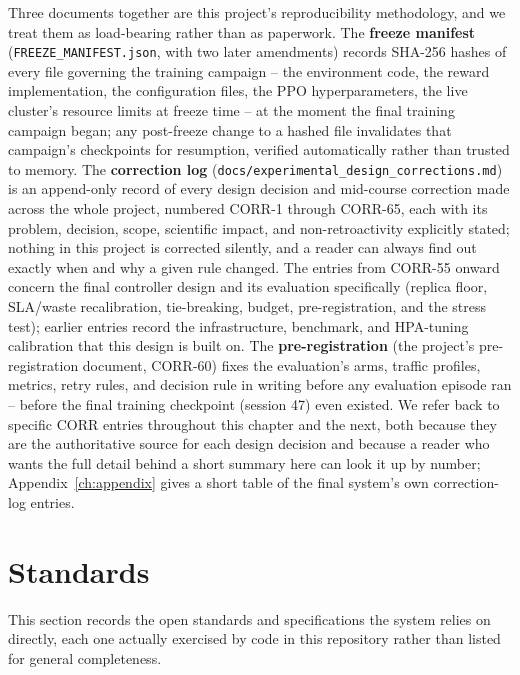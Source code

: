 Three documents together are this project's reproducibility methodology,
and we treat them as load-bearing rather than as paperwork. The
\textbf{freeze manifest} (\texttt{FREEZE\_\allowbreak MANIFEST.json}, with two later
amendments) records SHA-256 hashes of every file governing the training
campaign -- the environment code, the reward implementation, the
configuration files, the PPO hyperparameters, the live cluster's resource
limits at freeze time -- at the moment the final training campaign began;
any post-freeze change to a hashed file invalidates that campaign's
checkpoints for resumption, verified automatically rather than trusted to
memory. The \textbf{correction log}
(\texttt{docs/\allowbreak \allowbreak experimental\_\allowbreak design\_\allowbreak corrections.md}) is an
append-only record of every design decision and mid-course correction made
across the whole project, numbered CORR-1 through CORR-65, each with its
problem, decision, scope, scientific impact, and non-retroactivity
explicitly stated; nothing in this project is corrected silently, and a
reader can always find out exactly when and why a given rule changed. The
entries from CORR-55 onward concern the final controller design and its
evaluation specifically (replica floor, SLA/waste recalibration,
tie-breaking, budget, pre-registration, and the stress test); earlier
entries record the infrastructure, benchmark, and HPA-tuning calibration
that this design is built on. The \textbf{pre-registration}
(the project's pre-registration document, CORR-60) fixes the
evaluation's arms, traffic profiles, metrics, retry rules, and decision
rule in writing before any evaluation episode ran -- before the final
training checkpoint (session 47) even existed. We refer back to specific
CORR entries throughout this chapter and the next, both because they are
the authoritative source for each design decision and because a reader
who wants the full detail behind a short summary here can look it up by
number; Appendix~\ref{ch:appendix} gives a short table of the final
system's own correction-log entries.

\section{Standards}
\label{sec:standards}

This section records the open standards and specifications the system
relies on directly, each one actually exercised by code in this
repository rather than listed for general completeness.

